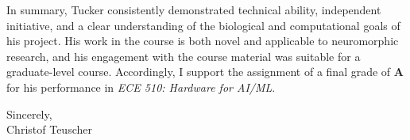 \documentclass[12pt]{letter}
\begin{document}
In summary, Tucker consistently demonstrated technical ability, independent initiative, and a clear understanding of the biological and computational goals of his project. His work in the course is both novel and applicable to neuromorphic research, and his engagement with the course material was suitable for a graduate-level course. Accordingly, I support the assignment of a final grade of \textbf{A} for his performance in \textit{ECE 510: Hardware for AI/ML}.

\closing{Sincerely,\\[1ex]
Christof Teuscher}
\end{document}
